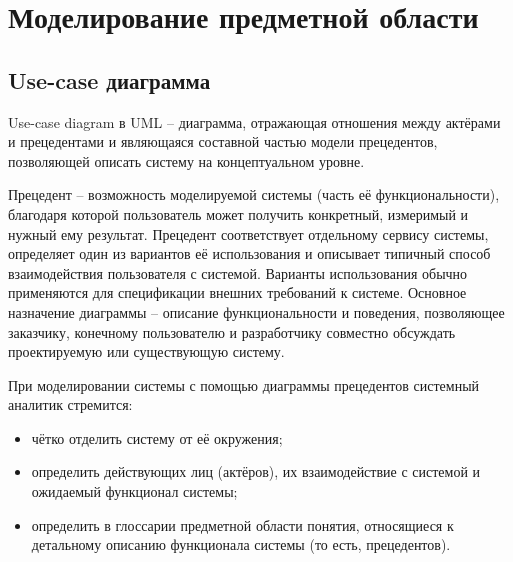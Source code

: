\lstset{style=fsharpstyle}

\section{Моделирование предметной области} 
\label{sec:practice:technology_used}


\subsection{Use-case диаграмма}
\label{sub:practice:microsoft_net}

Use-case diagram в UML -- диаграмма, отражающая отношения между актёрами и прецедентами и являющаяся составной частью модели прецедентов, позволяющей описать систему на концептуальном уровне.

Прецедент -- возможность моделируемой системы (часть её функциональности), благодаря которой пользователь может получить конкретный, измеримый и нужный ему результат. Прецедент соответствует отдельному сервису системы, определяет один из вариантов её использования и описывает типичный способ взаимодействия пользователя с системой. Варианты использования обычно применяются для спецификации внешних требований к системе. Основное назначение диаграммы -- описание функциональности и поведения, позволяющее заказчику, конечному пользователю и разработчику совместно обсуждать проектируемую или существующую систему.

При моделировании системы с помощью диаграммы прецедентов системный аналитик стремится:
\begin{itemize}
  \item чётко отделить систему от её окружения;
  \item определить действующих лиц (актёров), их взаимодействие с системой и ожидаемый функционал системы;
  \item определить в глоссарии предметной области понятия, относящиеся к детальному описанию функционала системы (то есть, прецедентов).
\end{itemize}

